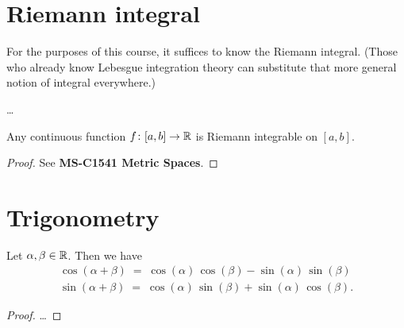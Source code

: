 \section{Riemann integral}

For the purposes of this course, it suffices to know the Riemann
integral. (Those who already know Lebesgue integration theory can
substitute that more general notion of integral everywhere.)

\begin{definition}
  \label{def:riemann_integral}
  \ldots
\end{definition}

\begin{lemma}
  \label{lem:continuous_implies_riemann_integrable}
  Any continuous function $f \colon [a,b] \to \mathbb{R}$ is Riemann
  integrable on $[a,b]$.
\end{lemma}
\begin{proof}
  See \textbf{MS-C1541 Metric Spaces}.
\end{proof}



\section{Trigonometry}

\begin{lemma}
  \label{lem:trigonometric_angle_sum}
  Let $\alpha, \beta \in \mathbb{R}$. Then we have
  \begin{align*}
    \cos (\alpha + \beta) \; = \; \cos (\alpha) \, \cos (\beta) - \sin (\alpha) \, \sin (\beta) \\
    \sin (\alpha + \beta) \; = \; \cos (\alpha) \, \sin (\beta) + \sin (\alpha) \, \cos (\beta) .
  \end{align*}
\end{lemma}
\begin{proof}
  \ldots
\end{proof}
